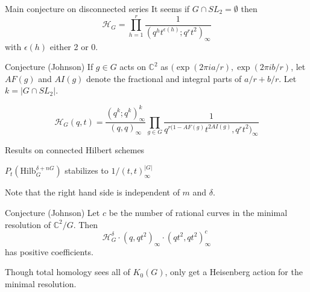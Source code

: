 \documentclass{beamer}
\newcommand{\Hilb}{\textrm{Hilb}}
\newcommand{\C}{\mathbb{C}}
\begin{document}
\begin{frame}{Main conjecture on disconnected series}
 It seems if $G\cap SL_2=\emptyset$ then
$$\mathcal{H}_{G}=\prod_{h=1}^r \frac{1}{(q^h t^{\epsilon(h)}; q^r t^2)_\infty}$$
with $\epsilon(h)$ either 2 or 0.

\begin{block}{Conjecture (Johnson)}
If $g\in G$ acts on $\C^2$ as $(\exp(2\pi i a/r),\exp(2\pi i b/r)$, let $AF(g)$ and $AI(g)$ denote the fractional and integral parts of $a/r+b/r$.
Let $k=|G\cap SL_2|$.

$$\mathcal{H}_G(q,t)= \frac{(q^k;q^k)^k_\infty}{(q,q)_\infty} \prod_{g\in G}\frac{1}{q^{r(1-AF(g)} t^{2AI(g)},q^rt^2)_\infty}$$

\end{block}

\end{frame}

\begin{frame}{Results on connected Hilbert schemes}
\begin{Theorem}[Johnson]
$P_t(\Hilb^{\delta+nG}_G)$ stabilizes to $1/(t,t)_\infty^{|G|}$
\end{Theorem}
Note that the right hand side is independent of $m$ and $\delta$.

\begin{block}{Conjecture (Johnson)}
Let $c$ be the number of rational curves in the minimal resolution of $\C^2/G$.  Then
$$\mathcal{H}^\delta_G\cdot(q,qt^2)_\infty\cdot (qt^2,qt^2)_\infty^c$$
has positive coefficients.
\end{block}
Though total homology sees all of $K_0(G)$, only get a Heisenberg action for the minimal resolution.

\end{frame}
\end{document}

